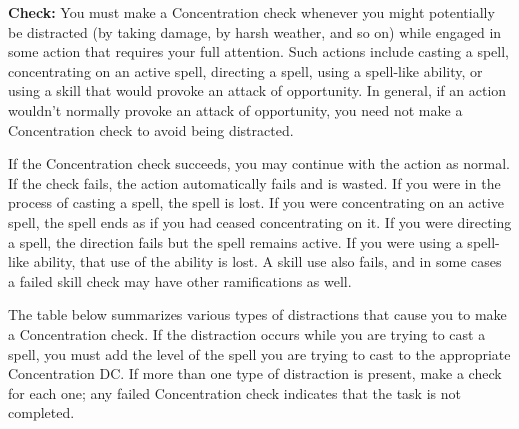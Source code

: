 
\textbf{Check:} You must make a Concentration check whenever you might potentially 
be distracted (by taking damage, by harsh weather, and so on) while engaged in 
some action that requires your full attention. Such actions include casting a spell, 
concentrating on an active spell, directing a spell, using a spell-like ability, 
or using a skill that would provoke an attack of opportunity. In general, if an 
action wouldn't normally provoke an attack of opportunity, you need not make a 
Concentration check to avoid being distracted.

If the Concentration check succeeds, you may continue with the action as normal. 
If the check fails, the action automatically fails and is wasted. If you were in 
the process of casting a spell, the spell is lost. If you were concentrating on 
an active spell, the spell ends as if you had ceased concentrating on it. If you 
were directing a spell, the direction fails but the spell remains active. If you 
were using a spell-like ability, that use of the ability is lost. A skill use also 
fails, and in some cases a failed skill check may have other ramifications as well.

The table below summarizes various types of distractions that cause you to make 
a Concentration check. If the distraction occurs while you are trying to cast a 
spell, you must add the level of the spell you are trying to cast to the appropriate 
Concentration DC. If more than one type of distraction is present, make a check 
for each one; any failed Concentration check indicates that the task is not completed.

